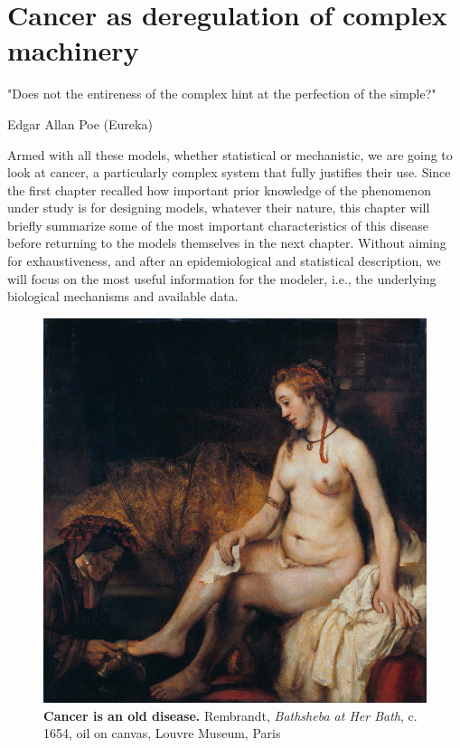 \documentclass[a4paper,12pt,twoside,onecolumn,openright,final,oldfontcommands]{memoir}
\newcommand{\initial}[1]{
	\lettrine[lines=3,lhang=0.33,nindent=0em]{
		\color{gray}
     		{\textsc{#1}}}{}}
\begin{document}
\chapter{Cancer as deregulation of complex
machinery}\label{cancer-as-deregulation-of-complex-machinery}

\epigraph{"Does not the entireness of the complex hint at the perfection of the simple?"}{Edgar Allan Poe (Eureka)}

\initial{A}rmed with all these models, whether statistical or
mechanistic, we are going to look at cancer, a particularly complex
system that fully justifies their use. Since the first chapter recalled
how important prior knowledge of the phenomenon under study is for
designing models, whatever their nature, this chapter will briefly
summarize some of the most important characteristics of this disease
before returning to the models themselves in the next chapter. Without
aiming for exhaustiveness, and after an epidemiological and statistical
description, we will focus on the most useful information for the
modeler, i.e., the underlying biological mechanisms and available data.

\begin{figure}

{\centering \includegraphics[width=0.9\linewidth]{fig/bath} 

}

\caption[Cancer is an old disease]{\textbf{Cancer is an old disease.} Rembrandt,
\emph{Bathsheba at Her Bath}, c. 1654, oil on canvas, Louvre Museum,
Paris}\label{fig:bath}
\end{figure}
\end{document}
